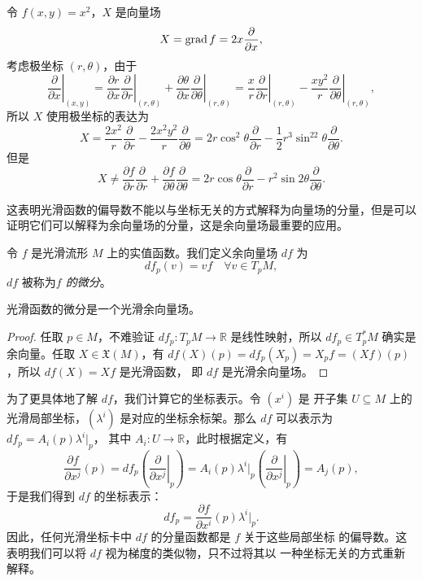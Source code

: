 \begin{example}
  令 $f(x,y)=x^2$，$X$ 是向量场
  \[
    X=\operatorname{grad} f=2x\frac{\partial}{\partial x},  
  \]
  考虑极坐标 $(r,\theta)$，由于
  \[
    \left.\frac{\partial}{\partial x}\right|_{(x,y)} 
    =\frac{\partial r}{\partial x}\left.\frac{\partial}{\partial r}\right|_{(r,\theta)} 
    +\frac{\partial \theta}{\partial x}\left.\frac{\partial}{\partial \theta}\right|_{(r,\theta)} 
    =\frac{x}{r}\left.\frac{\partial}{\partial r}\right|_{(r,\theta)} 
    -\frac{xy^2}{r}\left.\frac{\partial}{\partial \theta}\right|_{(r,\theta)},
  \]
  所以 $X$ 使用极坐标的表达为
  \[
    X=  \frac{2x^2}{r}\frac{\partial}{\partial r}
    -\frac{2x^2y^2}{r}\frac{\partial}{\partial \theta}
    =2r\cos^2\theta\frac{\partial}{\partial r}-
    \frac{1}{2}r^3\sin^22\theta\frac{\partial}{\partial \theta}.
  \]
  但是
  \[
    X\neq \frac{\partial f}{\partial r}\frac{\partial}{\partial r}
    +\frac{\partial f}{\partial\theta}\frac{\partial}{\partial \theta}
    =2r\cos\theta  \frac{\partial}{\partial r}-r^2\sin 2\theta
    \frac{\partial}{\partial \theta}.
  \]
\end{example}

这表明光滑函数的偏导数不能以与坐标无关的方式解释为向量场的分量，但是可以
证明它们可以解释为余向量场的分量，这是余向量场最重要的应用。

令 $f$ 是光滑流形 $M$ 上的实值函数。我们定义余向量场 $df$ 为
\[
  df_p(v)=vf\quad \forall v\in T_pM,  
\]
$df$ 被称为\emph{$f$ 的微分}。

\begin{proposition}
  光滑函数的微分是一个光滑余向量场。
\end{proposition}
\begin{proof}
  任取 $p\in M$，不难验证 $df_p:T_pM\to \mathbb{R}$ 是线性映射，所以
  $df_p\in T_p^*M$ 确实是余向量。任取 $X\in \mathfrak{X}(M)$，有
  $df(X)(p)=df_p(X_p)=X_pf=(Xf)(p)$，所以 $df(X)=Xf$ 是光滑函数，
  即 $df$ 是光滑余向量场。
\end{proof}

为了更具体地了解 $df$，我们计算它的坐标表示。令 $\left(x^i\right)$ 是
开子集 $U\subseteq M$ 上的光滑局部坐标，$\left(\lambda^i\right)$
是对应的坐标余标架。那么 $df$ 可以表示为 $df_p=A_i(p)\lambda^i|_p$，
其中 $A_i:U\to \mathbb{R}$，此时根据定义，有
\[
  \frac{\partial f}{\partial x^j}(p)=df_p\left(\left.\frac{\partial}{\partial x^j}\right|_p\right)
  =  A_i(p)\lambda^i|_p \left(\left.\frac{\partial}{\partial x^j}\right|_p\right)
  =A_j(p),
\]
于是我们得到 $df$ 的坐标表示：
\begin{equation}\label{eq:coordinate represent of df}
  df_p=\frac{\partial f}{\partial x^i}(p)\lambda^i|_p.
\end{equation}
因此，任何光滑坐标卡中 $df$ 的分量函数都是 $f$ 关于这些局部坐标
的偏导数。这表明我们可以将 $df$ 视为梯度的类似物，只不过将其以
一种坐标无关的方式重新解释。


